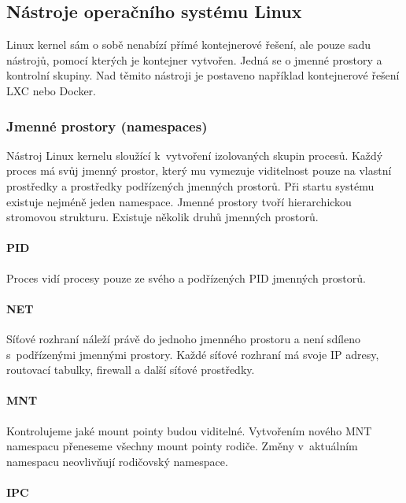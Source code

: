 \subsection{Nástroje operačního systému Linux}

Linux kernel sám o sobě nenabízí přímé kontejnerové řešení, ale pouze sadu nástrojů, pomocí kterých je kontejner vytvořen.
Jedná se o jmenné prostory a kontrolní skupiny.
Nad těmito nástroji je postaveno například kontejnerové řešení LXC nebo Docker.

\subsubsection{Jmenné prostory (namespaces)}

Nástroj Linux kernelu sloužící k~vytvoření izolovaných skupin procesů.
Každý proces má svůj jmenný prostor, který mu vymezuje viditelnost pouze na vlastní prostředky a prostředky podřízených jmenných prostorů.
Při startu systému existuje nejméně jeden namespace.
Jmenné prostory tvoří hierarchickou stromovou strukturu.
Existuje několik druhů jmenných prostorů.

\paragraph{PID}

Proces vidí procesy pouze ze svého a podřízených PID jmenných prostorů.

\paragraph{NET}

Síťové rozhraní náleží právě do jednoho jmenného prostoru a není sdíleno s~podřízenými jmennými prostory.
Každé síťové rozhraní má svoje IP adresy, routovací tabulky, firewall a další síťové prostředky. 

\paragraph{MNT}

Kontrolujeme jaké mount pointy budou viditelné.
Vytvořením nového MNT namespacu přeneseme všechny mount pointy rodiče.
Změny v~aktuálním namespacu neovlivňují rodičovský namespace. 


\paragraph{IPC}

